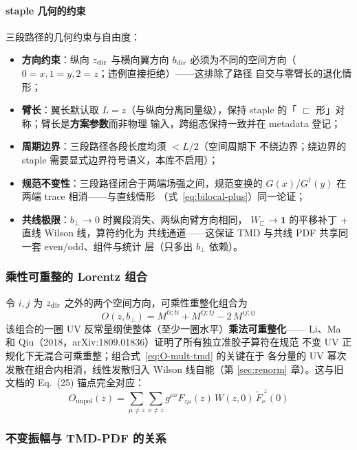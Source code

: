 \documentclass[11pt,a4paper]{ctexart}
\newcommand{\bperp}{b_{\perp}}
\begin{document}
\paragraph{staple 几何的约束}三段路径的几何约束与自由度：
\begin{itemize}
  \item \textbf{方向约束}：纵向 $z_{\rm dir}$ 与横向翼方向 $b_{\rm dir}$
  必须为不同的空间方向（$0=x,1=y,2=z$；违例直接拒绝）——这排除了路径
  自交与零臂长的退化情形；
  \item \textbf{臂长}：翼长默认取 $L=z$（与纵向分离同量级），保持
  staple 的「 $\sqsubset$ 形」对称；臂长是\textbf{方案参数}而非物理
  输入，跨组态保持一致并在 metadata 登记；
  \item \textbf{周期边界}：三段路径各段长度均须 $<L/2$（空间周期下
  不绕边界；绕边界的 staple 需要显式边界符号语义，本库不启用）；
  \item \textbf{规范不变性}：三段路径闭合于两端场强之间，规范变换的
  $G(x)$/$G^\dagger(y)$ 在两端 trace 相消——与直线情形
  （式~\eqref{eq:bilocal-plus}）同一论证；
  \item \textbf{共线极限}：$\bperp\to0$ 时翼段消失、两纵向臂方向相同，
  $W_\sqsubset\to\mathbf1$ 的平移补丁 + 直线 Wilson 线，算符约化为
  共线通道——这保证 TMD 与共线 PDF 共享同一套 even/odd、组件与统计
  层（只多出 $\bperp$ 依赖）。
\end{itemize}

\subsubsection{乘性可重整的 Lorentz 组合}

令 $i,j$ 为 $z_{\rm dir}$ 之外的两个空间方向，可乘性重整化组合为
\begin{equation}\label{eq:O-mult-tmd}
\boxed{\;O(z,\bperp) = M^{ti;ti} + M^{tj;tj} - 2\,M^{ij;ij}\;}
\end{equation}
该组合的一圈 UV 反常量纲使整体（至少一圈水平）\textbf{乘法可重整化}——
Li、Ma 和 Qiu（2018，arXiv:1809.01836）证明了所有独立准胶子算符在规范
不变 UV 正规化下无混合可乘重整；组合式~\eqref{eq:O-mult-tmd} 的关键在于
各分量的 UV 幂次发散在组合内相消，线性发散归入 Wilson 线自能（第
\ref{sec:renorm} 章）。这与旧文档的 Eq.~(25) 锚点完全对应：
\begin{equation}
O_{\text{unpol}}(z) = \sum_{\mu\ne z}\sum_{\nu\ne z} g^{\mu\nu}
F_{z\mu}(z)\,W(z,0)\,\tilde{F}_{\nu}^{\;z}(0)
\end{equation}

\subsubsection{不变振幅与 TMD-PDF 的关系}
\end{document}
